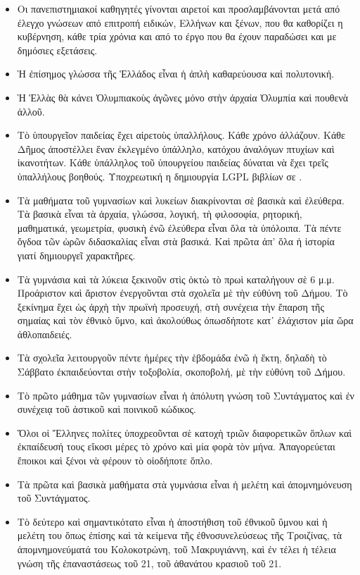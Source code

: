 \documentclass[a4paper]{article}
\begin{document}
\begin{itemize}
\item Οι πανεπιστημιακοί καθηγητές γίνονται αιρετοί και προσλαμβάνονται μετά από έλεγχο γνώσεων από επιτροπή ειδικών, Ελλήνων και ξένων, που θα καθορίζει η κυβέρνηση, κάθε τρία χρόνια και από το έργο που θα έχουν παραδώσει και με δημόσιες εξετάσεις.
\item Ἡ ἐπίσημος γλώσσα τῆς Ἑλλάδος εἶναι ἡ ἀπλὴ καθαρεύουσα καὶ πολυτονική.
\item Ἡ Ἑλλὰς θὰ κάνει Ὀλυμπιακοὺς ἀγῶνες μόνο στὴν ἀρχαία Ὀλυμπία καὶ πουθενὰ ἀλλοῦ.
\item Τὸ ὑπουργεῖον παιδείας ἔχει αἱρετοὺς ὑπαλλήλους. Κάθε χρόνο ἀλλάζουν. Κάθε Δῆμος ἀποστέλλει ἕναν ἐκλεγμένο ὑπάλληλο, κατόχου ἀναλόγων πτυχίων καὶ ἱκανοτήτων. Κάθε ὑπάλληλος τοῦ ὑπουργείου παιδείας δύναται νὰ ἔχει τρεῖς ὑπαλλήλους βοηθούς. Υποχρεωτική η δημιουργία LGPL βιβλίων σε \XeLaTeX.
\item Τὰ μαθήματα τοῦ γυμνασίων καὶ λυκείων διακρίνονται σὲ βασικὰ καὶ ἐλεύθερα. Τὰ βασικὰ εἶναι τὰ ἀρχαία, γλώσσα, λογική, τὴ φιλοσοφία, ρητορική, μαθηματικά, γεωμετρία, φυσικὴ ἐνῶ ἐλεύθερα εἶναι ὅλα τὰ ὑπόλοιπα. Τὰ πέντε ὄγδοα τῶν ὡρῶν διδασκαλίας εἶναι στὰ βασικά. Καὶ πρῶτα ἀπ' ὅλα ἡ ἱστορία γιατί δημιουργεῖ χαρακτῆρες.
\item Τὰ γυμνάσια καὶ τὰ λύκεια ξεκινοῦν στὶς ὀκτὼ τὸ πρωὶ καταλήγουν σὲ 6 μ.μ. Προάριστον καὶ ἄριστον ἐνεργοῦνται στὰ σχολεῖα μὲ τὴν εὐθύνη τοῦ Δήμου. Τὸ ξεκίνημα ἔχει ὡς ἀρχὴ τὴν πρωϊνὴ προσευχή, στὴ συνέχεια τὴν ἔπαρση τῆς σημαίας καὶ τὸν ἐθνικὸ ὕμνο, καὶ ἀκολούθως ὁπωσδήποτε κατ᾿ ἐλάχιστον μία ὥρα ἀθλοπαιδειές.
\item Τὰ σχολεῖα λειτουργοῦν πέντε ἡμέρες τὴν ἑβδομάδα ἐνῶ ἡ ἕκτη, δηλαδὴ τὸ Σάββατο ἐκπαιδεύονται στὴν τοξοβολία, σκοποβολή, μὲ τὴν εὐθύνη τοῦ Δήμου.
\item Τὸ πρῶτο μάθημα τῶν γυμνασίων εἶναι ἡ ἀπόλυτη γνώση τοῦ Συντάγματος καὶ ἐν συνέχειᾳ τοῦ ἀστικοῦ καὶ ποινικοῦ κώδικος.
\item Ὅλοι οἱ Ἕλληνες πολίτες ὑποχρεοῦνται σὲ κατοχὴ τριῶν διαφορετικῶν ὅπλων καὶ ἐκπαίδευσή τους εἴκοσι μέρες τὸ χρόνο καὶ μία φορὰ τὸν μήνα. Ἀπαγορεύεται ἔποικοι καὶ ξένοι νὰ φέρουν τὸ οἱοδήποτε ὅπλο.
\item Τὰ πρῶτα καὶ βασικὰ μαθήματα στὰ γυμνάσια εἶναι ἡ μελέτη καὶ ἀπομνημόνευση τοῦ Συντάγματος.
\item Τὸ δεύτερο καὶ σημαντικότατο εἶναι ἡ ἀποστήθιση τοῦ ἐθνικοῦ ὕμνου καὶ ἡ μελέτη του ὅπως ἐπίσης καὶ τὰ κείμενα τῆς ἐθνοσυνελεύσεως τῆς Τροιζίνας, τὰ ἀπομνημονεύματά του Κολοκοτρώνη, τοῦ Μακρυγιάννη, καὶ ἐν τέλει ἡ τέλεια γνώση τῆς ἐπαναστάσεως τοῦ 21, τοῦ ἀθανάτου κρασιοῦ τοῦ 21.

\end{itemize}
\end{document}
